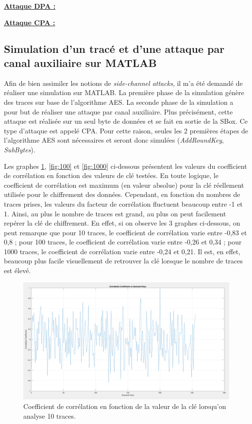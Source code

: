 \documentclass[10pt, oneside, a4paper]{article}
\begin{document}
\underline{\textbf{Attaque DPA :}}

\underline{\textbf{Attaque CPA :}}

\newpage

\subsection{Simulation d'un tracé et d'une attaque par canal auxiliaire sur MATLAB}

Afin de bien assimiler les notions de \textit{side-channel attacks}, il m'a été demandé de réaliser une simulation sur MATLAB. La première phase de la simulation génère des traces sur base de l'algorithme AES. La seconde phase de la simulation a pour but de réaliser une attaque par canal auxiliaire. Plus précisément, cette attaque est réalisée sur un seul byte de données et se fait en sortie de la SBox. Ce type d'attaque est appelé CPA. Pour cette raison, seules les 2 premières étapes de l'algorithme AES sont nécessaires et seront donc simulées (\textit{AddRoundKey}, \textit{SubBytes}).

Les graphes \ref{fig:10}, \ref{fig:100} et \ref{fig:1000} ci-dessous présentent les valeurs du coefficient de corrélation en fonction des valeurs de clé testées. En toute logique, le coefficient de corrélation est maximum (en valeur absolue) pour la clé réellement utilisée pour le chiffrement des données. Cependant, en fonction du nombres de traces prises, les valeurs du facteur de corrélation fluctuent beaucoup entre -1 et 1. Ainsi, au plus le nombre de traces est grand, au plus on peut facilement repérer la clé de chiffrement. En effet, si on observe les 3 graphes ci-dessous, on peut remarque que pour 10 traces, le coefficient de corrélation varie entre -0,83 et 0,8 ; pour 100 traces, le coefficient de corrélation varie entre -0,26 et 0,34 ; pour 1000 traces, le coefficient de corrélation varie entre -0,24 et 0,21.
Il est, en effet, beaucoup plus facile visuellement de retrouver la clé lorsque le nombre de traces est élevé.


\begin{figure}[htbp]
    \centering
    \includegraphics[width=1.05\textwidth]{image/10}    \caption{Coefficient de corrélation en fonction de la valeur de la clé lorsqu'on analyse 10 traces.}    \label{fig:10}
\end{figure}
\end{document}
